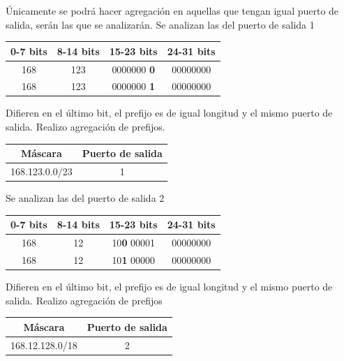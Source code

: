 \documentclass[titlepage,a4paper]{article}
\begin{document}
Únicamente se podrá hacer agregación en aquellas que tengan igual puerto de salida, serán las que se analizarán.
Se analizan las del puerto de salida 1

\begin{center}
    
    \begin{tabular}{c|c|c|c}

        0-7 bits & 8-14 bits & 15-23 bits & 24-31 bits \\
        \hline
        \hline
        168 & 123 & 0000000 \textbf{0} & 00000000 \\
        \hline
        168 & 123 & 0000000 \textbf{1} & 00000000 \\
    \end{tabular}
\end{center}


Difieren en el último bit, el prefijo es de igual longitud y el mismo puerto de salida. Realizo agregación de prefijos.


\begin{center}
    \begin{tabular}{c|c}
        Máscara & Puerto de salida \\
        \hline
        \hline
        168.123.0.0/23 &  1 \\
    \end{tabular}
\end{center}

Se analizan las del puerto de salida 2

\begin{center}
    \begin{tabular}{c|c|c|c}
        0-7 bits & 8-14 bits & 15-23 bits & 24-31 bits \\
        \hline
        \hline
        168 & 12 & 10\textbf{0} 00001 & 00000000 \\
        \hline
        168 & 12 & 10\textbf{1} 00000 & 00000000 \\
    \end{tabular}
\end{center}

Difieren en el último bit, el prefijo es de igual longitud y el mismo puerto de salida. Realizo agregación de prefijos 

\begin{center}
    \begin{tabular}{c|c}
        Máscara & Puerto de salida \\
        \hline
        \hline
        168.12.128.0/18 &  2 \\
    \end{tabular}
\end{center}
\end{document}
